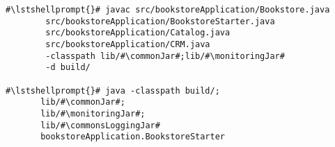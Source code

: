 \begin{lstlisting}[caption=Command to compile and run the instrumented Bookstore under Windows,label=lst:bookstoreStarterWin]
#\lstshellprompt{}# javac src/bookstoreApplication/Bookstore.java 
        src/bookstoreApplication/BookstoreStarter.java 
        src/bookstoreApplication/Catalog.java 
        src/bookstoreApplication/CRM.java 
        -classpath lib/#\commonJar#;lib/#\monitoringJar#
        -d build/

#\lstshellprompt{}# java -classpath build/;
       lib/#\commonJar#;
       lib/#\monitoringJar#;
       lib/#\commonsLoggingJar#
       bookstoreApplication.BookstoreStarter 
\end{lstlisting}
